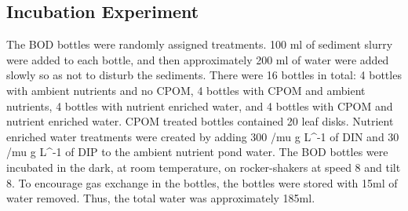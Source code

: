 \subsection{Incubation Experiment}
The BOD bottles were randomly assigned treatments. 100 ml of sediment slurry were added to each bottle, and then approximately 200 ml of water were added slowly so as not to disturb the sediments. There were 16 bottles in total: 4 bottles with ambient nutrients and no CPOM, 4 bottles with CPOM and ambient nutrients, 4 bottles with nutrient enriched water, and 4 bottles with CPOM and nutrient enriched water. CPOM treated bottles contained 20 leaf disks. Nutrient enriched water treatments were created by adding 300 /mu g L^-1 of DIN and 30 /mu g L^-1 of DIP to the ambient nutrient pond water. The BOD bottles were incubated in the dark, at room temperature, on rocker-shakers at speed 8 and tilt 8. To encourage gas exchange in the bottles, the bottles were stored with 15ml of water removed. Thus, the total water was approximately 185ml. 